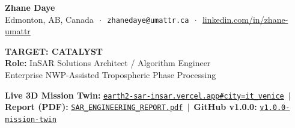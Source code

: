 \documentclass[10pt,letterpaper]{article}
\begin{document}
\begin{tcolorbox}[colframe=catalystdark,colback=catalystdark,coltext=white,boxrule=0pt,top=6pt,bottom=6pt]
\begin{minipage}[c]{0.58\textwidth}
    {\Large\textbf{Zhane Daye}} \\[2pt]
    {\footnotesize Edmonton, AB, Canada $\,\cdot\,$ \texttt{zhanedaye@umattr.ca} $\,\cdot\,$ \href{https://www.linkedin.com/in/zhane-umattr}{linkedin.com/in/zhane-umattr}}
\end{minipage}
\hfill
\begin{minipage}[c]{0.40\textwidth}
    \raggedleft
    {\large\textbf{TARGET: CATALYST}}\\[1pt]
    {\footnotesize\textbf{Role:} InSAR Solutions Architect / Algorithm Engineer}\\[1pt]
    {\scriptsize Enterprise NWP-Assisted Tropospheric Phase Processing}
\end{minipage}
\end{tcolorbox}

\vspace{-4pt}

\begin{tcolorbox}[colframe=bordergray,colback=lightbg,top=3pt,bottom=3pt]
\footnotesize
\textbf{Live 3D Mission Twin:} \href{https://earth2-sar-insar.vercel.app#city=it_venice&preset=sar_focus&stage=v3}{\texttt{earth2-sar-insar.vercel.app\#city=it\_venice}} $\,\vert\,$ 
\textbf{Report (PDF):} \href{https://earth2-sar-insar.vercel.app/reports/EARTH2_X_BAND_SAR_INSAR_ENGINEERING_REPORT.pdf}{\texttt{SAR\_ENGINEERING\_REPORT.pdf}} $\,\vert\,$ 
\textbf{GitHub v1.0.0:} \href{https://github.com/zrt219/earth2studio/releases/tag/v1.0.0-mission-twin}{\texttt{v1.0.0-mission-twin}}
\end{tcolorbox}

\vspace{-4pt}
\end{document}
